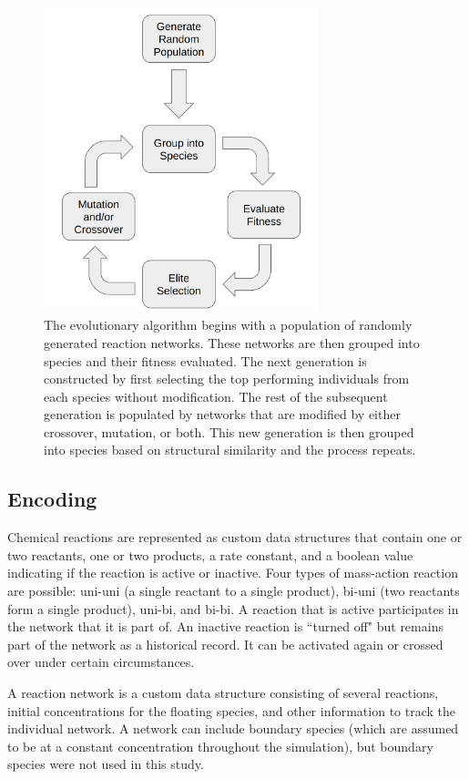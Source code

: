 \documentclass[12pt]{report}
\begin{document}
\begin{figure}
\centering
    \includegraphics[width=8cm]{images/algo_description_crossover.png}
    \caption[Overview of the evolution algorithm with speciation]{The evolutionary algorithm begins with a population of randomly generated reaction networks. These networks are then grouped into species and their fitness evaluated. The next generation is constructed by first selecting the top performing individuals from each species without modification. The rest of the subsequent generation is populated by networks that are modified by either crossover, mutation, or both. This new generation is then grouped into species based on structural similarity and the process repeats.}
    \label{fig:algo_description_crossover}
\end{figure}


\subsection{Encoding}
Chemical reactions are represented as custom data structures that contain one or two reactants, one or two products, a rate constant, and a boolean value indicating if the reaction is active or inactive. Four types of mass-action reaction are possible: uni-uni (a single reactant to a single product), bi-uni (two reactants form a single product), uni-bi, and bi-bi. A reaction that is active participates in the network that it is part of. An inactive reaction is ``turned off" but remains part of the network as a historical record. It can be activated again or crossed over under certain circumstances. 

A reaction network is a custom data structure consisting of several reactions, initial concentrations for the floating species, and other information to track the individual network. A network can include boundary species (which are assumed to be at a constant concentration throughout the simulation), but boundary species were not used in this study.
\end{document}
